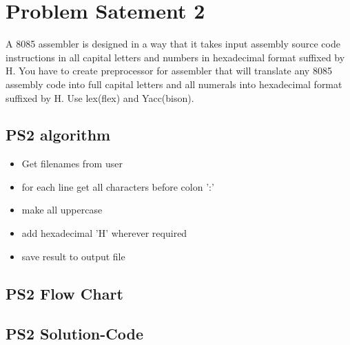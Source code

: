 \documentclass{article}
\begin{document}
    \section{Problem Satement 2}
    A 8085 assembler is designed in a way that it takes input assembly source code instructions in
all capital letters and numbers in hexadecimal format suffixed by H.
You have to create preprocessor for assembler that will translate any 8085 assembly code into
full capital letters and all numerals into hexadecimal format suffixed by H.
Use lex(flex) and Yacc(bison).
        
    \subsection{PS2 algorithm}
    \begin{itemize}
        \item Get filenames from user
        \item for each line get all characters before colon ':'
        \item make all uppercase
        \item add hexadecimal 'H' wherever required
        \item save result to output file
    \end{itemize}
    \subsection{PS2 Flow Chart}
    \pagebreak
    \subsection{PS2 Solution-Code}
    
\end{document}
